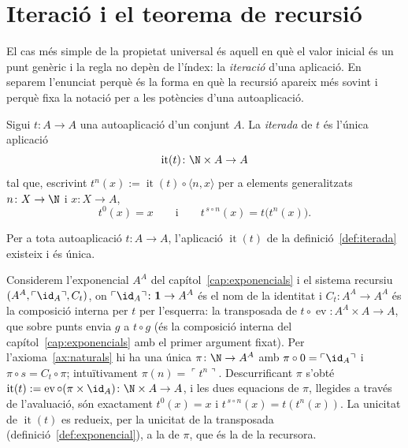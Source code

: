 \section{Iteració i el teorema de recursió}\label{sec:recursio}

El cas més simple de la propietat universal és aquell en què el valor
inicial és un punt genèric i la regla no depèn de l'índex: la
\emph{iteració} d'una aplicació. En separem l'enunciat perquè és la forma
en què la recursió apareix més sovint i perquè fixa la notació per a les
potències d'una autoaplicació.

\begin{definicio}\label{def:iterada}
Sigui \(t\colon A\to A\) una autoaplicació d'un conjunt \(A\). La
\emph{iterada} de \(t\) és l'única aplicació
\[
\operatorname{it}(t)\colon\N\times A\to A
\]
tal que, escrivint \(t^{n}(x):=\operatorname{it}(t)\circ\langle n,x\rangle\)
per a elements generalitzats \(n\colon X\to\N\) i \(x\colon X\to A\),
\[
t^{0}(x)=x
\qquad\text{i}\qquad
t^{\,s\circ n}(x)=t\bigl(t^{n}(x)\bigr).
\]
\end{definicio}

\begin{proposicio}\label{prop:iterada}
Per a tota autoaplicació \(t\colon A\to A\), l'aplicació
\(\operatorname{it}(t)\) de la definició~\ref{def:iterada} existeix i és
única.
\end{proposicio}

\begin{prova}
Considerem l'exponencial \(A^{A}\) del capítol~\ref{cap:exponencials} i
el sistema recursiu \((A^{A},\ulcorner\id_A\urcorner,C_t)\), on
\(\ulcorner\id_A\urcorner\colon\mathbf1\to A^{A}\) és el nom de la
identitat i \(C_t\colon A^{A}\to A^{A}\) és la composició interna per
\(t\) per l'esquerra: la transposada de
\(t\circ\operatorname{ev}\colon A^A\times A\to A\), que sobre punts envia
\(g\) a \(t\circ g\) (és la composició interna del
capítol~\ref{cap:exponencials} amb el primer argument fixat).
Per l'axioma~\ref{ax:naturals} hi ha una única
\(\pi\colon\N\to A^{A}\) amb \(\pi\circ 0=\ulcorner\id_A\urcorner\) i
\(\pi\circ s=C_t\circ\pi\); intuïtivament \(\pi(n)=\ulcorner
t^{n}\urcorner\). Descurrificant \(\pi\) s'obté
\(\operatorname{it}(t):=\operatorname{ev}\circ(\pi\times\id_A)
\colon\N\times A\to A\), i les dues equacions de \(\pi\), llegides a
través de l'avaluació, són exactament \(t^{0}(x)=x\) i
\(t^{\,s\circ n}(x)=t(t^{n}(x))\). La unicitat de \(\operatorname{it}(t)\)
es redueix, per la unicitat de la transposada
(definició~\ref{def:exponencial}), a la de \(\pi\), que és la de la
recursora.
\end{prova}

